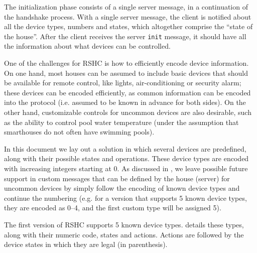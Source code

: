The initialization phase consists of a single server message, in a continuation of the handshake process. With a single server message, the client is notified about all the device types, numbers and states, which altogether comprise the ``state of the house''. After the client receives the server {\tt init} message, it should have all the information about what devices can be controlled.

One of the challenges for RSHC is how to efficiently encode device information. On one hand, most houses can be assumed to include basic devices that should be available for remote control, like lights, air-conditioning or security alarm; these devices can be encoded efficiently, as common information can be encoded into the protocol (i.e. assumed to be known in advance for both sides). On the other hand, customizable controls for uncommon devices are also desirable, such as the ability to control pool water temperature (under the assumption that smarthouses do not often have swimming pools).

In this document we lay out a solution in which several devices are predefined, along with their possible states and operations. These device types are encoded with increasing integers starting at 0. As discussed in , we leave possible future support in custom messages that can be defined by the house (server) for uncommon devices by simply follow the encoding of known device types and continue the numbering (e.g. for a version that supports 5 known device types, they are encoded as 0--4, and the first custom type will be assigned 5).

The first version of RSHC supports 5 known device types.  details these types, along with their numeric code, states and actions. Actions are followed by the device states in which they are legal (in parenthesis).

